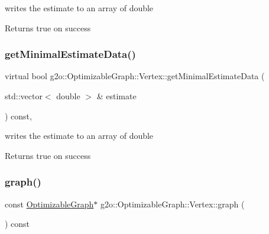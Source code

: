 writes the estimate to an array of double \begin{DoxyReturn}{Returns}
true on success 
\end{DoxyReturn}
\mbox{\label{classg2o_1_1_optimizable_graph_1_1_vertex_af928d21e7304cb21d75acf56bc40470a}} 
\subsubsection{\texorpdfstring{get\+Minimal\+Estimate\+Data()}{getMinimalEstimateData()}\hspace{0.1cm}{\footnotesize\ttfamily [2/2]}}
{\footnotesize\ttfamily virtual bool g2o\+::\+Optimizable\+Graph\+::\+Vertex\+::get\+Minimal\+Estimate\+Data (\begin{DoxyParamCaption}\item[{std\+::vector$<$ double $>$ \&}]{estimate }\end{DoxyParamCaption}) const\hspace{0.3cm}{\ttfamily [inline]}, {\ttfamily [virtual]}}

writes the estimate to an array of double \begin{DoxyReturn}{Returns}
true on success 
\end{DoxyReturn}
\mbox{\label{classg2o_1_1_optimizable_graph_1_1_vertex_a8cf4be7e2442444d9d43a80cc8388b1e}} 
\subsubsection{\texorpdfstring{graph()}{graph()}\hspace{0.1cm}{\footnotesize\ttfamily [1/2]}}
{\footnotesize\ttfamily const \mbox{\hyperlink{structg2o_1_1_optimizable_graph}{Optimizable\+Graph}}$\ast$ g2o\+::\+Optimizable\+Graph\+::\+Vertex\+::graph (\begin{DoxyParamCaption}{ }\end{DoxyParamCaption}) const\hspace{0.3cm}{\ttfamily [inline]}}

